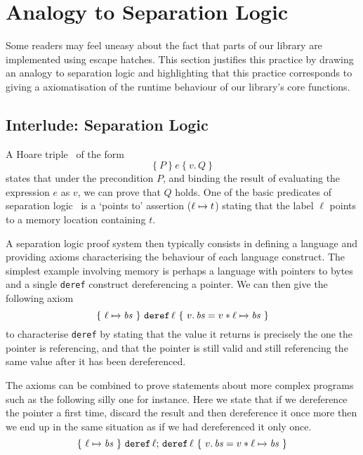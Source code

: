 \section{Analogy to Separation Logic}\label{appendix:hoare}

Some readers may feel uneasy about the fact that parts of our
library are implemented using \idris{} escape hatches.
%
This section justifies this practice by drawing an analogy to
separation logic and highlighting that this practice corresponds
to giving a axiomatisation of the runtime behaviour of our
library's core functions.

\newcommand{\Pointer}[3]{\ensuremath{#1 \xmapsto{#2} #3}}
\newcommand{\Hoare}[4]{\ensuremath{\lbrace~ #1 ~\rbrace~ #2 ~\lbrace~ #3.\, #4 ~\rbrace}}
\newcommand{\Meaning}[2]{\ensuremath{\llbracket \,#1\, \rrbracket\, (\Mu{#2})}}
\newcommand{\Mu}[1]{\ensuremath{\mu \, \mathit{#1}}}

\subsection{Interlude: Separation Logic}

A Hoare triple~\cite{DBLP:journals/cacm/Hoare69} of the form
\[ \Hoare{P}{e}{v}{Q} \]
states that under the precondition
$P$, and binding the result of evaluating the expression $e$ as $v$,
we can prove that $Q$ holds.
%
One of the basic predicates of separation logic~\cite{DBLP:conf/lics/Reynolds02}
is a `points to' assertion (\Pointer{\ell}{}{t}) stating that
the label $\ell$ points to a memory location containing $t$.

A separation logic proof system then typically consists in defining
a language and providing axioms characterising the behaviour of
each language construct.
%
The simplest example involving memory is perhaps a language
with pointers to bytes and a single \texttt{deref} construct
dereferencing a pointer.
%
We can then give the following axiom
\[ \Hoare{\Pointer{\ell}{}{\mathit{bs}}}{\texttt{deref}\,\ell}{v}{\mathit{bs} = v \ast \Pointer{\ell}{}{\mathit{bs}}} \]
to characterise \texttt{deref} by stating that the value
it returns is precisely the one the pointer is referencing,
and that the pointer is still valid and still referencing
the same value after it has been dereferenced.

The axioms can be combined to prove statements about more
complex programs such as the following silly one for instance.
Here we state that if we dereference the pointer a first time,
discard the result and then dereference it once more then we
end up in the same situation as if we had dereferenced it only once.
\[ \Hoare{\Pointer{\ell}{}{\mathit{bs}}}{\texttt{deref}\,\ell;\, \texttt{deref}\,\ell}{v}{\mathit{bs} = v \ast \Pointer{\ell}{}{\mathit{bs}}} \]

